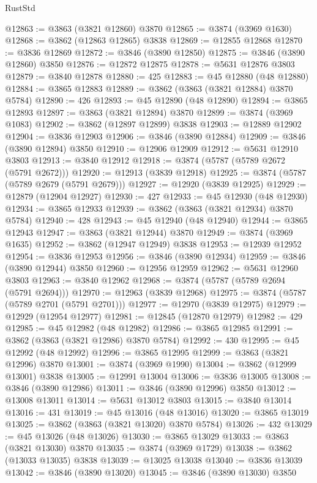 \begin{lexlean}{RustStd}
\begin{coremodule}
@12863 := @3863 (@3821 @12860) @3870
@12865 := @3874 (@3969 @1630)
@12868 := @3862 (@12863 @12865) @3838
@12869 := @12855 @12868
@12870 := @3836 @12869
@12872 := @3846 (@3890 @12850)
@12875 := @3846 (@3890 @12860) @3850
@12876 := @12872 @12875
@12878 := @5631 @12876 @3803
@12879 := @3840 @12878
@12880 := 425
@12883 := @45 @12880 (@48 @12880)
@12884 := @3865 @12883
@12889 := @3862 (@3863 (@3821 @12884) @3870 @5784)
@12890 := 426
@12893 := @45 @12890 (@48 @12890)
@12894 := @3865 @12893
@12897 := @3863 (@3821 @12894) @3870
@12899 := @3874 (@3969 @1083)
@12902 := @3862 (@12897 @12899) @3838
@12903 := @12889 @12902
@12904 := @3836 @12903
@12906 := @3846 (@3890 @12884)
@12909 := @3846 (@3890 @12894) @3850
@12910 := @12906 @12909
@12912 := @5631 @12910 @3803
@12913 := @3840 @12912
@12918 := @3874 (@5787 (@5789 @2672 (@5791 @2672)))
@12920 := @12913 (@3839 @12918)
@12925 := @3874 (@5787 (@5789 @2679 (@5791 @2679)))
@12927 := @12920 (@3839 @12925)
@12929 := @12879 (@12904 @12927)
@12930 := 427
@12933 := @45 @12930 (@48 @12930)
@12934 := @3865 @12933
@12939 := @3862 (@3863 (@3821 @12934) @3870 @5784)
@12940 := 428
@12943 := @45 @12940 (@48 @12940)
@12944 := @3865 @12943
@12947 := @3863 (@3821 @12944) @3870
@12949 := @3874 (@3969 @1635)
@12952 := @3862 (@12947 @12949) @3838
@12953 := @12939 @12952
@12954 := @3836 @12953
@12956 := @3846 (@3890 @12934)
@12959 := @3846 (@3890 @12944) @3850
@12960 := @12956 @12959
@12962 := @5631 @12960 @3803
@12963 := @3840 @12962
@12968 := @3874 (@5787 (@5789 @2694 (@5791 @2694)))
@12970 := @12963 (@3839 @12968)
@12975 := @3874 (@5787 (@5789 @2701 (@5791 @2701)))
@12977 := @12970 (@3839 @12975)
@12979 := @12929 (@12954 @12977)
@12981 := @12845 (@12870 @12979)
@12982 := 429
@12985 := @45 @12982 (@48 @12982)
@12986 := @3865 @12985
@12991 := @3862 (@3863 (@3821 @12986) @3870 @5784)
@12992 := 430
@12995 := @45 @12992 (@48 @12992)
@12996 := @3865 @12995
@12999 := @3863 (@3821 @12996) @3870
@13001 := @3874 (@3969 @1990)
@13004 := @3862 (@12999 @13001) @3838
@13005 := @12991 @13004
@13006 := @3836 @13005
@13008 := @3846 (@3890 @12986)
@13011 := @3846 (@3890 @12996) @3850
@13012 := @13008 @13011
@13014 := @5631 @13012 @3803
@13015 := @3840 @13014
@13016 := 431
@13019 := @45 @13016 (@48 @13016)
@13020 := @3865 @13019
@13025 := @3862 (@3863 (@3821 @13020) @3870 @5784)
@13026 := 432
@13029 := @45 @13026 (@48 @13026)
@13030 := @3865 @13029
@13033 := @3863 (@3821 @13030) @3870
@13035 := @3874 (@3969 @1729)
@13038 := @3862 (@13033 @13035) @3838
@13039 := @13025 @13038
@13040 := @3836 @13039
@13042 := @3846 (@3890 @13020)
@13045 := @3846 (@3890 @13030) @3850

\end{coremodule}
\end{lexlean}
